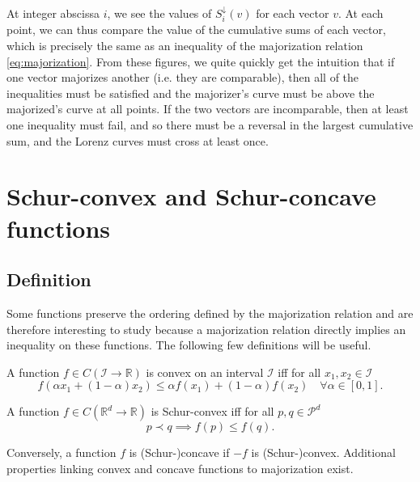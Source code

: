 At integer abscissa $i$, we see the values of $S_i^\downarrow (v)$ for each vector $v$. At each point, we can thus compare the value of the cumulative sums of each vector, which is precisely the same as an inequality of the majorization relation \ref{eq:majorization}. From these figures, we quite quickly get the intuition that if one vector majorizes another (i.e. they are comparable), then all of the inequalities must be satisfied and the majorizer's curve must be above the majorized's curve at all points. If the two vectors are incomparable, then at least one inequality must fail, and so there must be a reversal in the largest cumulative sum, and the Lorenz curves must cross at least once.



\section{Schur-convex and Schur-concave functions}

\subsection{Definition}

Some functions preserve the ordering defined by the majorization relation and are therefore interesting to study because a majorization relation directly implies an inequality on these functions. The following few definitions will be useful.

\begin{definition}
    A function $f \in C(\mathcal{I} \to \mathbb{R})$ is convex on an interval $\mathcal{I}$ iff for all $x_1, x_2 \in \mathcal{I}$
    \begin{equation}
        f(\alpha x_1 + (1-\alpha) x_2) \leq \alpha f(x_1) + (1-\alpha) f(x_2) \quad \forall \alpha \in [0, 1].
    \end{equation}
\end{definition}

\begin{definition}
    A function $f \in C(\mathbb{R}^d \to \mathbb{R})$ is Schur-convex iff for all $p, q \in \mathcal{P}^d$
    \begin{equation}
        p \prec q \implies f(p) \leq f(q).
    \end{equation}
\end{definition}

Conversely, a function $f$ is (Schur-)concave if $-f$ is (Schur-)convex. Additional properties linking convex and concave functions to majorization exist.

